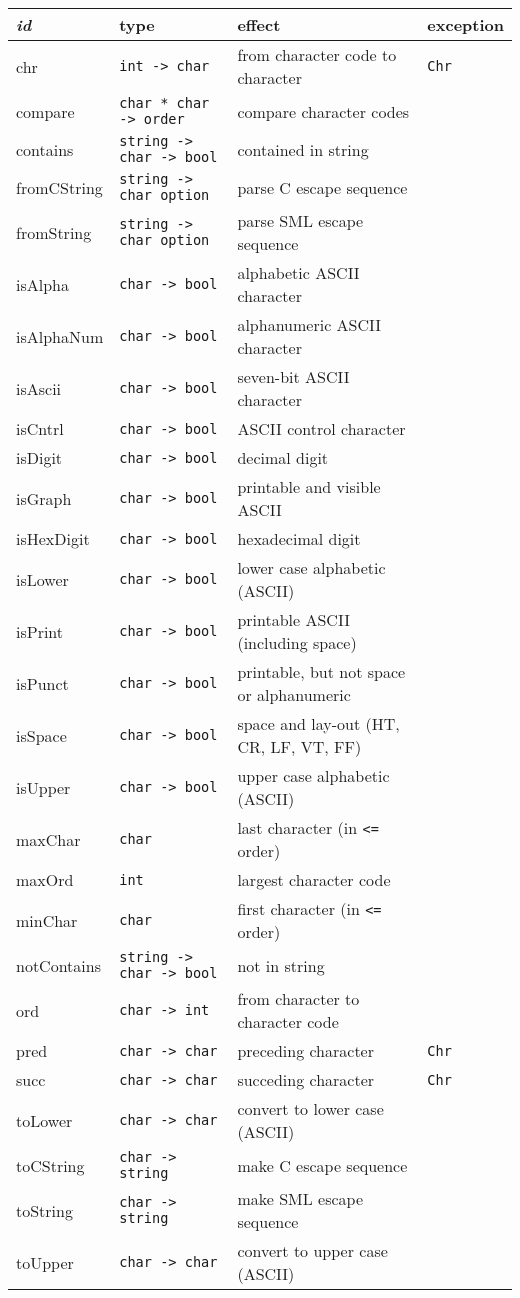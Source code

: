 \documentclass[fleqn]{article}
\begin{document}
\begin{tabular}{@{\tt\ \ }llll}\hline
{\it id\/}  & type &     effect & exception \\\hline

chr & {\tt int  -> char} & from character code to character & {\tt Chr}\\
compare & {\tt char * char -> order} & compare character codes \\
contains & {\tt string -> char -> bool} & contained in string\\
fromCString & {\tt string -> char option} & parse C escape sequence\\
fromString & {\tt string -> char option} & parse SML escape sequence\\
isAlpha    & {\tt char -> bool}   & alphabetic ASCII character \\
isAlphaNum & {\tt char -> bool}   & alphanumeric ASCII character\\
isAscii    & {\tt char -> bool}   & seven-bit ASCII character \\ 
isCntrl    & {\tt char -> bool}   & ASCII control character \\
isDigit    & {\tt char -> bool}   & decimal digit \\
isGraph    & {\tt char -> bool}   & printable and visible ASCII \\
isHexDigit & {\tt char -> bool}   & hexadecimal digit \\
isLower    & {\tt char -> bool}   & lower case alphabetic (ASCII) \\
isPrint    & {\tt char -> bool}   & printable ASCII (including space) \\
isPunct    & {\tt char -> bool}   & printable, but not space or alphanumeric \\
isSpace    & {\tt char -> bool}   & space and lay-out (HT, CR, LF, VT, FF) \\
isUpper    & {\tt char -> bool}   & upper case alphabetic (ASCII) \\
maxChar    & {\tt char} & last character (in {\tt <=} order)\\
maxOrd     & {\tt int} & largest character code\\
minChar    & {\tt char} & first character (in {\tt <=} order)\\
notContains & {\tt string -> char -> bool} & not in string\\
ord & {\tt char -> int} & from character to character code \\
pred & {\tt char -> char} & preceding character & {\tt Chr}\\
succ & {\tt char -> char} & succeding character & {\tt Chr}\\
toLower    & {\tt char -> char} & convert to lower case (ASCII) \\
toCString  & {\tt char -> string} & make C escape sequence \\
toString   & {\tt char -> string} & make SML escape sequence \\
toUpper    & {\tt char -> char} & convert to upper case (ASCII) \\\hline
\end{tabular}
\end{document}
